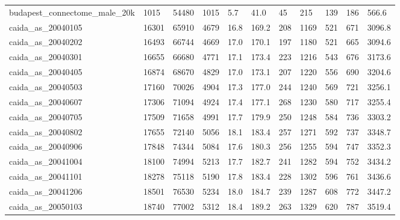 \begin{longtable}{lllllllllll}
 budapest\_connectome\_male\_20k                       & 1015       & 54480     & 1015  & 5.7    & 41.0   & 45    & 215    & 139    & 186    & 566.6   \\
 caida\_as\_20040105                                  & 16301      & 65910     & 4679  & 16.8   & 169.2  & 208   & 1169   & 521    & 671    & 3096.8  \\
 caida\_as\_20040202                                  & 16493      & 66744     & 4669  & 17.0   & 170.1  & 197   & 1180   & 521    & 665    & 3094.6  \\
 caida\_as\_20040301                                  & 16655      & 66680     & 4771  & 17.1   & 173.4  & 223   & 1216   & 543    & 676    & 3173.6  \\
 caida\_as\_20040405                                  & 16874      & 68670     & 4829  & 17.0   & 173.1  & 207   & 1220   & 556    & 690    & 3204.6  \\
 caida\_as\_20040503                                  & 17160      & 70026     & 4904  & 17.3   & 177.0  & 244   & 1240   & 569    & 721    & 3256.1  \\
 caida\_as\_20040607                                  & 17306      & 71094     & 4924  & 17.4   & 177.1  & 268   & 1230   & 580    & 717    & 3255.4  \\
 caida\_as\_20040705                                  & 17509      & 71658     & 4991  & 17.7   & 179.9  & 250   & 1248   & 584    & 736    & 3303.2  \\
 caida\_as\_20040802                                  & 17655      & 72140     & 5056  & 18.1   & 183.4  & 257   & 1271   & 592    & 737    & 3348.7  \\
 caida\_as\_20040906                                  & 17848      & 74344     & 5084  & 17.6   & 180.3  & 256   & 1255   & 594    & 747    & 3352.3  \\
 caida\_as\_20041004                                  & 18100      & 74994     & 5213  & 17.7   & 182.7  & 241   & 1282   & 594    & 752    & 3434.2  \\
 caida\_as\_20041101                                  & 18278      & 75118     & 5190  & 17.8   & 183.4  & 228   & 1302   & 596    & 761    & 3436.6  \\
 caida\_as\_20041206                                  & 18501      & 76530     & 5234  & 18.0   & 184.7  & 239   & 1287   & 608    & 772    & 3447.2  \\
 caida\_as\_20050103                                  & 18740      & 77002     & 5312  & 18.4   & 189.2  & 263   & 1329   & 620    & 787    & 3519.4  \\

\end{longtable}
